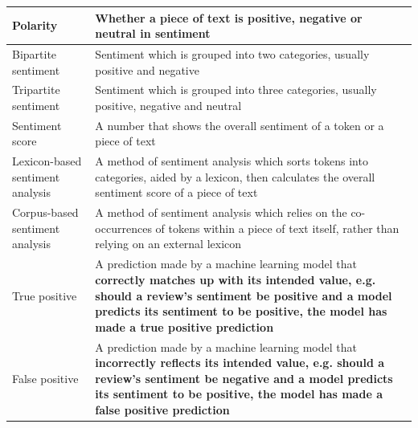 \documentclass[12pt,bibliography=totocnumbered]{scrartcl}
\begin{document}
\begin{center}
\begin{longtable}{|p{}|p{}|}
		\hline
		Polarity                         & Whether a piece of text is positive, negative or neutral in sentiment                                                                                                                                                                               \\
		\hline
		Bipartite sentiment              & Sentiment which is grouped into two categories, usually positive and negative                                                                                                                                                                       \\
		\hline
		Tripartite sentiment             & Sentiment which is grouped into three categories, usually positive, negative and neutral                                                                                                                                                            \\
		\hline
		Sentiment score                  & A number that shows the overall sentiment of a token or a piece of text                                                                                                                                                                             \\
		\hline
		Lexicon-based sentiment analysis & A method of sentiment analysis which sorts tokens into categories, aided by a lexicon, then calculates the overall sentiment score of a piece of text                                                                                               \\
		\hline
		Corpus-based sentiment analysis  & A method of sentiment analysis which relies on the co-occurrences of tokens within a piece of text itself, rather than relying on an external lexicon                                                                                               \\
		\hline
		True positive                    & A prediction made by a machine learning model that \bf{correctly} matches up with its intended value, e.g. should a review’s sentiment be positive and a model predicts its sentiment to be positive, the model has made a true positive prediction \\
		\hline
		False positive                   & A prediction made by a machine learning model that \bf{incorrectly} reflects its intended value, e.g. should a review’s sentiment be negative and a model predicts its sentiment to be positive, the model has made a false positive prediction     \\
		\hline
	\end{longtable}
\end{center}
\end{document}
